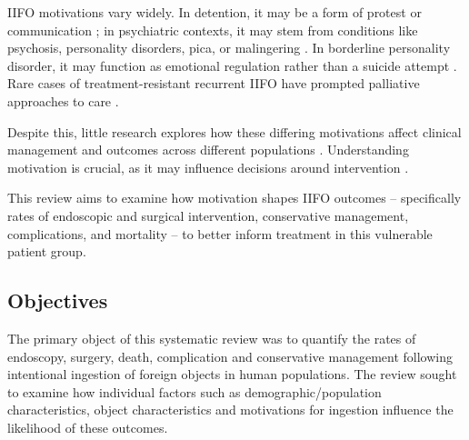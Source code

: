 IIFO motivations vary widely. In detention, it may be a form of protest or communication \cite{Puggioni_2014,Losanoff_1997e}; in psychiatric contexts, it may stem from conditions like psychosis, personality disorders, pica, or malingering \cite{Gitlin_2007, Poynter_2011, Tromans_2019, Al-Faham_2020k, Pantazopoulos_2022, Aitchison_2024, Losanoff_1997e}. In borderline personality disorder, it may function as emotional regulation rather than a suicide attempt \cite{Gitlin_2007}. Rare cases of treatment-resistant recurrent IIFO have prompted palliative approaches to care \cite{Jaini_2023}.

Despite this, little research explores how these differing motivations affect clinical management and outcomes across different populations \cite{Bhugra_2010, Haase_2022, Hedrick_2023a}. Understanding motivation is crucial, as it may influence decisions around intervention \cite{Ataya_2013, Albeldawi_2014}.

This review aims to examine how motivation shapes IIFO outcomes -- specifically rates of endoscopic and surgical intervention, conservative management, complications, and mortality -- to better inform treatment in this vulnerable patient group. 

\subsection{Objectives}
\noindent The primary object of this systematic review was to quantify the rates of endoscopy, surgery, death, complication and conservative management following intentional ingestion of foreign objects in human populations. The review sought to examine how individual factors such as demographic/population characteristics, object characteristics and motivations for ingestion influence the likelihood of these outcomes.
